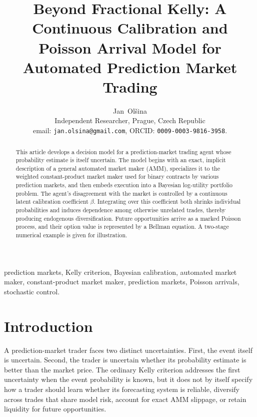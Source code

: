 \documentclass[journal, a4paper]{IEEEtran}
\begin{document}
\title{Beyond Fractional Kelly: A Continuous Calibration and Poisson Arrival Model for Automated Prediction Market Trading}

\author{Jan~Ol\v{s}ina\\[1ex] Independent Researcher, Prague, Czech Republic\\
email: \texttt{jan.olsina@gmail.com},  ORCID: \texttt{0009-0003-9816-3958}.}


\maketitle

\begin{abstract}
This article develops a decision model for a prediction-market trading agent whose probability estimate is itself uncertain. The model begins with an exact, implicit description of a general automated market maker (AMM), specializes it to the weighted constant-product market maker used for binary contracts by various prediction markets, and then embeds execution into a Bayesian log-utility portfolio problem. The agent's disagreement with the market is controlled by a continuous latent calibration coefficient $\beta$. Integrating over this coefficient both shrinks individual probabilities and induces dependence among otherwise unrelated trades, thereby producing endogenous diversification. Future opportunities arrive as a marked Poisson process, and their option value is represented by a Bellman equation. A two-stage numerical example is given for illustration.
\end{abstract}

\begin{IEEEkeywords}
prediction markets, Kelly criterion, Bayesian calibration, automated market maker, constant-product market maker, prediction markets, Poisson arrivals, stochastic control.
\end{IEEEkeywords}

\section{Introduction}
A prediction-market trader faces two distinct uncertainties. First, the event itself is uncertain. Second, the trader is uncertain whether its probability estimate is better than the market price. The ordinary Kelly criterion addresses the first uncertainty when the event probability is known, but it does not by itself specify how a trader should learn whether its forecasting system is reliable, diversify across trades that share model risk, account for exact AMM slippage, or retain liquidity for future opportunities.
\end{document}
